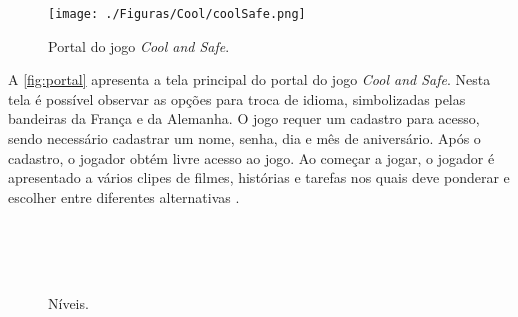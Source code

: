 

\begin{figure}[htb]

	\caption{\label{fig:portal}Portal do jogo \textit{Cool and Safe}.}
  \begin{center}%
    \texttt{[image: ./Figuras/Cool/coolSafe.png]}
	\end{center}%

\end{figure}

A \autoref{fig:portal} apresenta a tela principal do portal do jogo \textit{Cool and Safe}. Nesta tela é possível observar as opções para troca de idioma, simbolizadas pelas bandeiras da França e da Alemanha. O jogo requer um cadastro para acesso, sendo necessário cadastrar um nome, senha, dia e mês de aniversário. Após o cadastro, o jogador obtém livre acesso ao jogo. Ao começar a jogar, o jogador é apresentado a vários clipes de filmes, histórias e tarefas nos quais deve ponderar e escolher entre diferentes alternativas \cite{mueller2012web}. 

\begin{figure}%
  \vspace{-5pt}
  \caption{\label{fig:coolniveis}Níveis.\vspace{1pt}}

  \vspace{-4pt}
  \\
  \vspace{-4pt}
  \\
  \vspace{-4pt}
  \\
  \vspace{-4pt}
  \vspace{-10pt}
\end{figure}


